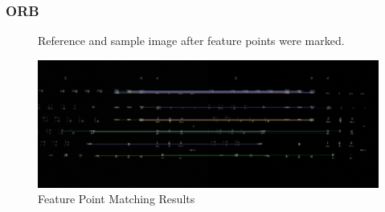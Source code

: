 		\subsubsection{ORB}
		\begin{figure}[H]
			\caption{Reference and sample image after feature points were marked.}
			\label{fig:siftFeaturePoints}
		\end{figure}
		\begin{figure}[H]
			\includegraphics[width=\linewidth]{figsrc/simulation/normal/orb_matches.png}
			\caption{Feature Point Matching Results}
			\label{fig:sifeMatchingResult}
		\end{figure}
